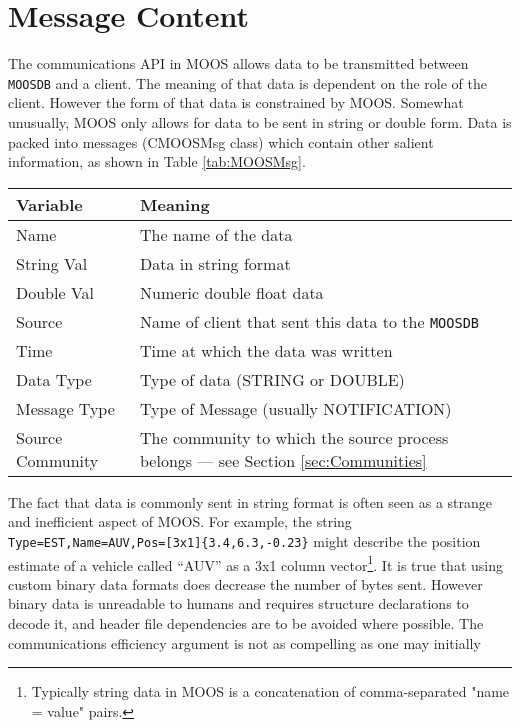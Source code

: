 \documentclass[a4paper,10pt]{article}
\newcommand{\Code}[1]{\texttt{#1} }
\newcommand{\code}[1]{\Code{#1} }
\newcommand{\DB}   {\code{{MOOSDB}}}
\begin{document}
\section{Message Content}\label{sec:Content}
The communications API in MOOS allows data to be transmitted
between \DB and a client. The meaning of that data is dependent on
the role of the client. However the form of that data is
constrained by MOOS. Somewhat unusually, MOOS only allows for data
to be sent in string or double form. Data is packed into messages
(CMOOSMsg class) which contain other salient information, as shown in
Table \ref{tab:MOOSMsg}.
\begin{table*}
\centering
\begin{tabular}{l|l}\hline
  {\textbf{Variable}} & {\textbf{Meaning}} \\ \hline
  Name  & The name of the data \\
  String Val & Data in string format \\
  Double Val & Numeric double float data \\
  Source & Name of client that sent this data to the \DB \\
  Time & Time at which the data was written \\
  Data Type & Type of data (STRING or DOUBLE)  \\
  Message Type & Type of Message (usually NOTIFICATION) \\
  Source Community & The community to which the source process
belongs --- see Section \ref{sec:Communities}\\\hline
\end{tabular}\vspace{7mm}
  \caption{Contents of MOOS Message}\label{tab:MOOSMsg}
\end{table*}
The fact that data is commonly sent in string format is often seen
as a strange and inefficient aspect of MOOS. For example, the
string \verb"Type=EST,Name=AUV,Pos=[3x1]{3.4,6.3,-0.23}" might
describe the position estimate of a vehicle called ``AUV'' as a
3x1 column vector\footnote{Typically string data in MOOS is a
concatenation of comma-separated "name = value" pairs.}. It is
true that using custom binary data formats does decrease the
number of bytes sent. However binary data is unreadable to humans
and requires structure declarations to decode it, and header file
dependencies are to be avoided where possible. The communications
efficiency argument is not as compelling as one may initially
\end{document}
